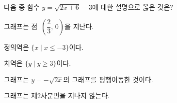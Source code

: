 \hspace*{2mm}\begin{minipage}[t]{\dimexpr\linewidth-2mm\relax}\vspace{0pt}
다음 중 함수 $y=\sqrt{2x+6}-3$에 대한 설명으로 옳은 것은?
\begin{choicesv}{\rule[-3ex]{0pt}{8ex}그래프는 점~$\left(\dfrac{2}{3},\,0\right)$을 지난다.}{\rule[-3ex]{0pt}{8ex}정의역은 $\{x \mid x\le -3\}$이다.}{\rule[-3ex]{0pt}{8ex}치역은 $\{y \mid y\ge 3\}$이다.}{\rule[-3ex]{0pt}{8ex}그래프는 $y=-\sqrt{2x}$의 그래프를 평행이동한 것이다.}{\rule[-3ex]{0pt}{8ex}그래프는 제$2$사분면을 지나지 않는다.}\end{choicesv}\end{minipage}
